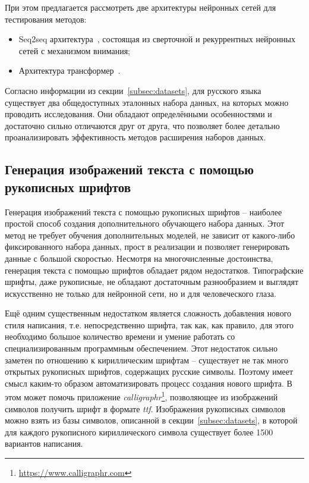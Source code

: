 При этом предлагается рассмотреть две архитектуры нейронных сетей для тестирования методов:
\begin{itemize}
    \item Seq2seq архитектура~\cite{sutskever2014sequence}, состоящая из сверточной и рекуррентных нейронных сетей с механизмом внимания;
    \item Архитектура трансформер~\cite{vaswani2017attention}.
\end{itemize}

Согласно информации из секции~\ref{subsec:datasets}, для русского языка существует два общедоступных эталонных набора данных,
на которых можно проводить исследования.
Они обладают определёнными особенностями и достаточно сильно отличаются друг от друга,
что позволяет более детально проанализировать эффективность методов расширения наборов данных.


\subsection{Генерация изображений текста с помощью рукописных шрифтов}
\label{subsec:synthetic}

Генерация изображений текста с помощью рукописных шрифтов -- наиболее простой способ создания дополнительного обучающего набора данных.
Этот метод не требует обучения дополнительных моделей, не зависит от какого-либо фиксированного набора данных,
прост в реализации и позволяет генерировать данные с большой скоростью.
Несмотря на многочисленные достоинства, генерация текста с помощью шрифтов обладает рядом недостатков.
Типографские шрифты, даже рукописные, не обладают достаточным разнообразием и выглядят искусственно не только для нейронной сети,
но и для человеческого глаза.

Ещё одним существенным недостатком является сложность добавления нового стиля написания, т.е. непосредственно шрифта,
так как, как правило, для этого необходимо большое количество времени и умение работать со специализированным программным обеспечением.
Этот недостаток сильно заметен по отношению к кириллическим шрифтам -- существует не так много открытых рукописных шрифтов, содержащих русские символы.
Поэтому имеет смысл каким-то образом автоматизировать процесс создания нового шрифта.
В этом может помочь приложение \textit{calligraphr}\footnote{\url{https://www.calligraphr.com}},
позволяющее из изображений символов получить шрифт в формате \textit{ttf}.
Изображения рукописных символов можно взять из базы символов, описанной в секции~\ref{subsec:datasets},
в которой для каждого рукописного кириллического символа существует более 1500 вариантов написания.

